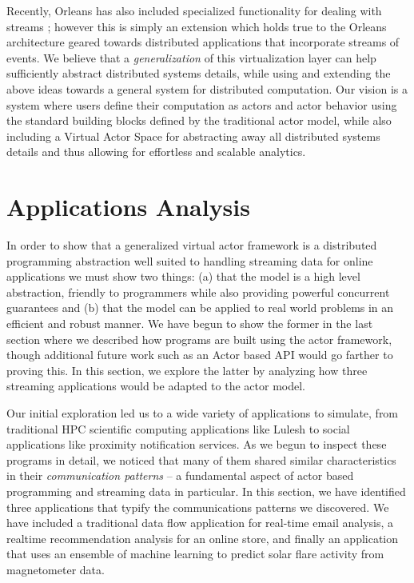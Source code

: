 \documentclass[conference,twocolumn,10pt]{IEEEtran}
\begin{document}
Recently, Orleans has also included specialized functionality for dealing with streams \cite{research_microsoft_2015}; however this is simply an extension which holds true to the Orleans architecture geared towards distributed applications that incorporate streams of events. We believe that a \textit{generalization} of this virtualization layer can help sufficiently abstract distributed systems details, while using and extending the above ideas towards a general  system for distributed computation. Our vision is a system where users define their computation as actors and actor behavior using the standard building blocks defined by the traditional actor model, while also including a Virtual Actor Space for abstracting away all distributed systems details and thus allowing for effortless and scalable analytics.




\section{Applications Analysis}

In order to show that a generalized virtual actor framework is a distributed programming abstraction well suited to handling streaming data for online applications we must show two things: (a) that the model is a high level abstraction, friendly to programmers while also providing powerful concurrent guarantees and (b) that the model can be applied to real world problems in an efficient and robust manner. We have begun to show the former in the last section where we described how programs are built using the actor framework, though additional future work such as an Actor based API would go farther to proving this. In this section, we explore the latter by analyzing how three streaming applications would be adapted to the actor model.

Our initial exploration led us to a wide variety of applications to simulate, from traditional HPC scientific computing applications like Lulesh to social applications like proximity notification services. As we begun to inspect these programs in detail, we noticed that many of them shared similar characteristics in their \textit{communication patterns} -- a fundamental aspect of actor based programming and streaming data in particular. In this section, we have identified three applications that typify the communications patterns we discovered. We have included a traditional data flow application for real-time email analysis, a realtime recommendation analysis for an online store, and finally an application that uses an ensemble of machine learning to predict solar flare activity from magnetometer data.
\end{document}

